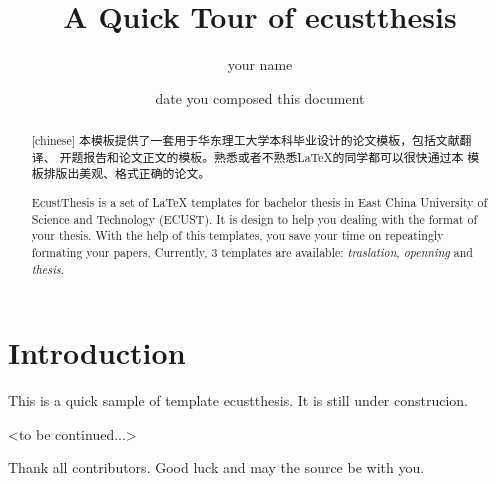 \documentclass{ecustthesis}
\author{your name}
\date{date  you composed this document}
\title{A Quick Tour of ecustthesis}
\begin{document}
\begin{abstract}[chinese]
  本模板提供了一套用于华东理工大学本科毕业设计的论文模板，包括文献翻译、
  开题报告和论文正文的模板。熟悉或者不熟悉\LaTeX 的同学都可以很快通过本
  模板排版出美观、格式正确的论文。
\end{abstract}

\begin{abstract}
  EcustThesis is a set of LaTeX templates for bachelor thesis in East
  China University of Science and Technology (ECUST). It is design to
  help you dealing with the format of your thesis. With the help of
  this templates, you save your time on repeatingly formating your
  papers. Currently, 3 templates are available:
  \emph{traslation}, \emph{openning} and \emph{thesis}.
\end{abstract}

\tableofcontents

\section{Introduction}
\label{section: introduction}

This is a quick sample of template ecustthesis.
It is still under construcion.

<to be continued...>


\acknowledge

Thank all contributors. Good luck and may the source be with you.
\end{document}
